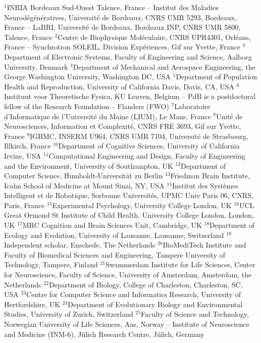 $^{1}$INRIA Bordeaux Sud-Ouest Talence, France – Institut des Maladies Neurodégénératives, Université de Bordeaux, CNRS UMR 5293, Bordeaux, France – LaBRI, Université de Bordeaux, Bordeaux INP, CNRS UMR 5800, Talence, France
$^{2}$Centre de Biophysique Moléculaire, CNRS UPR4301, Orléans, France -- Synchrotron SOLEIL, Division Expériences, Gif sur Yvette, France
$^{3}$Department of Electronic Systems, Faculty of Engineering and Science, Aalborg University, Denmark
$^{4}$Department of Mechanical and Aerospace Engineering, the George Washington University, Washington DC, USA
$^{5}$Department of Population Health and Reproduction, University of California Davis, Davis, CA, USA
$^{6}$Instituut voor Theoretische Fysica, KU Leuven, Belgium -- PdB is a postdoctoral fellow of the Research Foundation -- Flanders (FWO)
$^{7}$Laboratoire d'Informatique de l'Université du Maine (LIUM), Le Mans, France
$^{8}$Unité de Neurosciences, Information et Complexité, CNRS FRE 3693, Gif sur Yvette, France
$^{9}$IGBMC, INSERM U964, CNRS UMR 7104, Université de Strasbourg, Illkirch, France
$^{10}$Department of Cognitive Sciences, University of California Irvine, USA
$^{11}$Computational Engineering and Design, Faculty of Engineering and the Environment, University of Southampton, UK
$^{12}$Department of Computer Science, Humboldt-Universität zu Berlin
$^{13}$Friedman Brain Institute, Icahn School of Medicine at Mount Sinai, NY, USA
$^{14}$Institut des Systèmes Intelligent et de Robotique, Sorbonne Universités, UPMC Univ Paris 06, CNRS, Paris, France
$^{15}$Experimental Psychology, University College London, UK
$^{16}$UCL Great Ormond St Institute of Child Health. University College London, London, UK
$^{17}$MRC Cognition and Brain Sciences Unit, Cambridge, UK
$^{18}$Department of Ecology and Evolution, University of Lausanne, Lausanne, Switzerland
$^{19}$Independent scholar, Enschede, The Netherlands
$^{20}$BioMediTech Institute and Faculty of Biomedical Sciences and Engineering, Tampere University of Technology, Tampere, Finland
$^{21}$Swammerdam Institute for Life Sciences, Center for Neuroscience, Faculty of Science, University of Amsterdam, Amsterdam, the Netherlands
$^{22}$Department of Biology, College of Charleston, Charleston, SC, USA
$^{23}$Centre for Computer Science and Informatics Research, University of Hertfordshire, UK
$^{24}$Department of Evolutionary Biology and Environmental Studies, University of Zurich, Switzerland
$^{25}$Faculty of Science and Technology, Norwegian University of Life Sciences, Aas, Norway -- Institute of Neuroscience and Medicine (INM-6), Jülich Research Centre, Jülich, Germany
